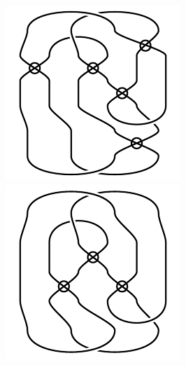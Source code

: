 \begin{figure}[H]
\begin{minipage}[b]{.18\linewidth}
\end{minipage}
\begin{minipage}[b]{.18\linewidth}
\centering
\includegraphics[width=\linewidth]{../data/virtual_4_14.png}
\end{minipage}
\begin{minipage}[b]{.18\linewidth}
\centering
\includegraphics[width=\linewidth]{../data/virtual_4_15.png}

\end{minipage}
\end{figure}
